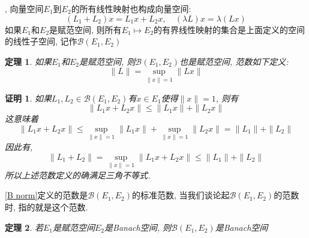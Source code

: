 \documentclass[a4paper,11pt]{article}
\theoremstyle{mystyle}
\newtheorem{theorem}{\hspace{2em}定理}[section]
\newtheorem{Proof}{\hspace{2em}证明}[section]
\begin{document}
, 向量空间$E_1$到$E_2$的所有线性映射也构成向量空间:
\begin{equation*}
  (L_1+L_2)x=L_1x+L_2x,\quad (\lambda L)x=\lambda(Lx)
\end{equation*}
如果$E_1$和$E_2$是赋范空间, 则所有$E_1\mapsto E_2$的有界线性映射的集合是上面定义的空间的线性子空间, 记作$\mathcal{B}(E_1,E_2)$
\begin{theorem}
  如果$E_1$和$E_2$是赋范空间, 则$\mathcal{B}(E_1,E_2)$也是赋范空间, 范数如下定义:
  \begin{equation*}\label{B norm}
    \|L\|=\sup_{\|x\|=1}\|Lx\|
  \end{equation*}
\end{theorem}
\begin{Proof}
  如果$L_1,L_2\in\mathcal{B}(E_1,E_2)$有$x\in E_1$使得$\|x\|=1$, 则有
  \begin{equation*}
    \|L_1x+L_2x\|\leq\|L_1x\|+\|L_2x\|
  \end{equation*}
  这意味着
  \begin{equation*}
    \|L_1x+L_2x\|\leq\sup_{\|x\|=1}\|L_1x\|+\sup_{\|x\|=1}\|L_2x\|=\|L_1\|+\|L_2\|
  \end{equation*}
  因此有,
  \begin{equation*}
    \|L_1+L_2\|=\sup_{\|x\|=1}\|L_1x+L_2x\|\leq\|L_1\|+\|L_2\|
  \end{equation*}
  所以上述范数定义的确满足三角不等式.
\end{Proof}
\eqref{B norm}定义的范数是$\mathcal{B}(E_1,E_2)$的标准范数, 当我们谈论起$\mathcal{B}(E_1,E_2)$的范数时, 指的就是这个范数.
\begin{theorem}
  若$E_1$是赋范空间$E_2$是Banach空间, 则$\mathcal{B}(E_1,E_2)$是Banach空间
\end{theorem}
\end{document}
